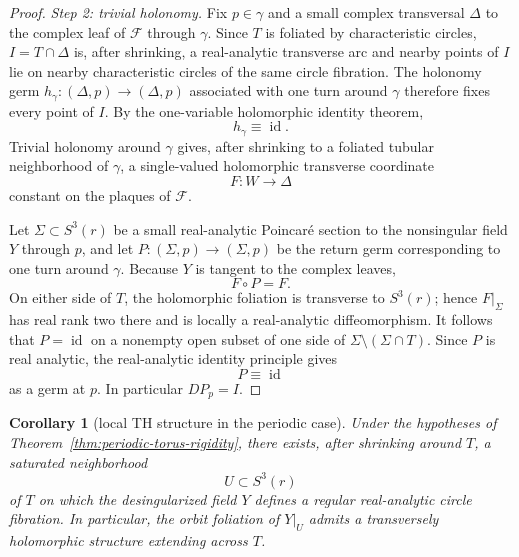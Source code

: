\documentclass[11pt,reqno]{article}
\newtheorem{corollary}{Corollary}
\theoremstyle{remark}
\newcommand{\F}{\mathcal F}
\begin{document}
\begin{proof}
\smallskip
\noindent\emph{Step 2: trivial holonomy.}
Fix $p\in\gamma$ and a small complex transversal $\Delta$ to the complex leaf of $\F$ through $\gamma$. Since $T$ is foliated by characteristic circles, $I=T\cap\Delta$ is, after shrinking, a real-analytic transverse arc and nearby points of $I$ lie on nearby characteristic circles of the same circle fibration. The holonomy germ $h_\gamma:(\Delta,p)\to(\Delta,p)$ associated with one turn around $\gamma$ therefore fixes every point of $I$. By the one-variable holomorphic identity theorem,
\[
 h_\gamma\equiv\operatorname{id}.
\]
Trivial holonomy around $\gamma$ gives, after shrinking to a foliated tubular neighborhood of $\gamma$, a single-valued holomorphic transverse coordinate
\[
 F:W\longrightarrow\Delta
\]
constant on the plaques of $\F$.

Let $\Sigma\subset S^3(r)$ be a small real-analytic Poincar\'e section to the nonsingular field $Y$ through $p$, and let $P:(\Sigma,p)\to(\Sigma,p)$ be the return germ corresponding to one turn around $\gamma$. Because $Y$ is tangent to the complex leaves,
\[
 F\circ P=F.
\]
On either side of $T$, the holomorphic foliation is transverse to $S^3(r)$; hence $F|_\Sigma$ has real rank two there and is locally a real-analytic diffeomorphism. It follows that $P=\operatorname{id}$ on a nonempty open subset of one side of $\Sigma\setminus(\Sigma\cap T)$. Since $P$ is real analytic, the real-analytic identity principle gives
\[
 P\equiv\operatorname{id}
\]
as a germ at $p$. In particular $DP_p=I$.
\end{proof}

\begin{corollary}[local TH structure in the periodic case]\label{cor:local-th-periodic}
Under the hypotheses of Theorem~\ref{thm:periodic-torus-rigidity}, there exists, after shrinking around $T$, a saturated neighborhood
\[
 U\subset S^3(r)
\]
of $T$ on which the desingularized field $Y$ defines a regular real-analytic circle fibration. In particular, the orbit foliation of $Y|_U$ admits a transversely holomorphic structure extending across $T$.
\end{corollary}
\end{document}
